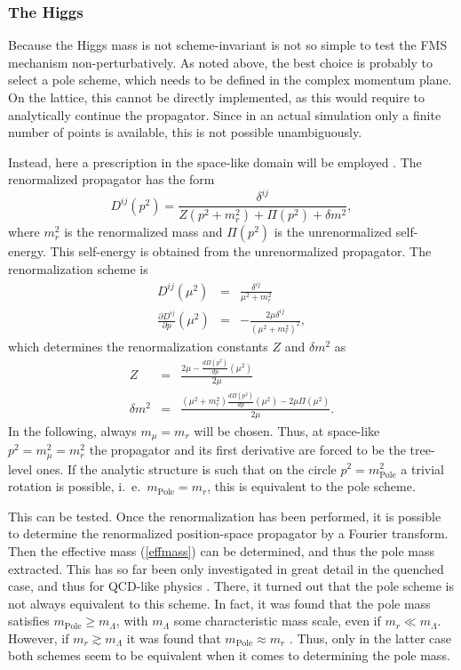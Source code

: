 \documentclass[final,12pt,3p,longtitle]{elsarticle}
\newcommand*{\no}{\noindent}
\newcommand*{\bea}{\begin{eqnarray}}
\newcommand*{\eea}{\end{eqnarray}}
\newcommand*{\be}{\begin{equation}}
\newcommand*{\ee}{\end{equation}}
\newcommand*{\pd}{\partial}
\newcommand*{\pref}[1]{(\ref{#1})}
\newcommand*{\nn}{\nonumber}
\newcommand*{\1}{1\!\!\!\bot}
\begin{document}
\subsubsection{The Higgs}\label{sss:higgs}

Because the Higgs mass is not scheme-invariant \cite{Bohm:2001yx} is not so simple to test the FMS mechanism non-perturbatively. As noted above, the best choice is probably to select a pole scheme, which needs to be defined in the complex momentum plane. On the lattice, this cannot be directly implemented, as this would require to analytically continue the propagator. Since in an actual simulation only a finite number of points is available, this is not possible unambiguously. 

Instead, here a prescription in the space-like domain will be employed \cite{Maas:2010nc,Maas:2016edk}. The renormalized propagator has the form \cite{Bohm:2001yx}
\be
D^{ij}(p^2)=\frac{\delta^{ij}}{Z(p^2+m_r^2)+\Pi(p^2)+\delta m^2}\nn,
\ee
\no where $m_r^2$ is the renormalized mass and $\Pi(p^2)$ is the unrenormalized self-energy. This self-energy is obtained from the unrenormalized propagator. The renormalization scheme is
\bea
D^{ij}(\mu^2)&=&\frac{\delta^{ij}}{\mu^2+m_r^2}\label{prc}\\
\frac{\pd D^{ij}}{\pd p}(\mu^2)&=&-\frac{2\mu\delta^{ij}}{(\mu^2+m_r^2)^2}\label{dprc},
\eea
\no which determines the renormalization constants $Z$ and $\delta m^2$ as
\bea
Z&=&\frac{2\mu-\frac{d\Pi(p^2)}{dp}(\mu^2)}{2\mu}\nn\\
\delta m^2&=&\frac{(\mu^2+m_r^2)\frac{d\Pi(p^2)}{dp}(\mu^2)-2\mu\Pi(\mu^2)}{2\mu}\nn.
\eea
\no In the following, always $m_\mu=m_r$ will be chosen. Thus, at space-like $p^2=m_\mu^2=m_r^2$ the propagator and its first derivative are forced to be the tree-level ones. If the analytic structure is such that on the circle $p^2=m_{\text{Pole}}^2$ a trivial rotation is possible, i.\ e.\ $m_\text{Pole}=m_r$, this is equivalent to the pole scheme.

This can be tested. Once the renormalization has been performed, it is possible to determine the renormalized position-space propagator by a Fourier transform. Then the effective mass \pref{effmass} can be determined, and thus the pole mass extracted. This has so far been only investigated in great detail in the quenched case, and thus for QCD-like physics \cite{Maas:2016edk}. There, it turned out that the pole scheme is not always equivalent to this scheme. In fact, it was found that the pole mass satisfies $m_{\text{Pole}}\ge m_\Lambda$, with $m_\Lambda$ some characteristic mass scale, even if $m_r\ll m_{\Lambda}$. However, if $m_r\gtrsim m_\Lambda$ it was found that $m_{\text{Pole}}\approx m_r$ \cite{Maas:2016edk}. Thus, only in the latter case both schemes seem to be equivalent when it comes to determining the pole mass.
\end{document}
